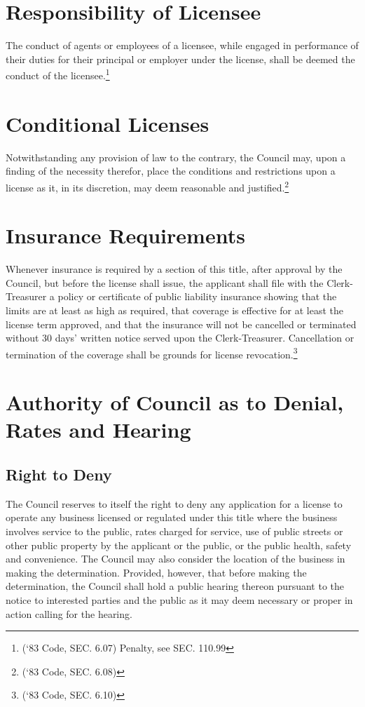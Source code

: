 \section{Responsibility of Licensee}
The conduct of agents or employees of a licensee, while engaged in performance of their duties for their principal or employer under the license, shall be deemed the conduct of the licensee.\footnote{(‘83 Code, SEC. 6.07)  Penalty, see SEC. 110.99}

\section{Conditional Licenses}
Notwithstanding any provision of law to the contrary, the Council may, upon a finding of the necessity therefor, place the conditions and restrictions upon a license as it, in its discretion, may deem reasonable and justified.\footnote{(‘83 Code, SEC. 6.08)}

\section{Insurance Requirements}
Whenever insurance is required by a section of this title, after approval by the Council, but before the license shall issue, the applicant shall file with the Clerk-Treasurer a policy or certificate of public liability insurance showing that the limits are at least as high as required, that coverage is effective for at least the license term approved, and that the insurance will not be cancelled or terminated without 30 days’ written notice served upon the Clerk-Treasurer.  Cancellation or termination of the coverage shall be grounds for license revocation.\footnote{(‘83 Code, SEC. 6.10)}

\section{Authority of Council as to Denial, Rates and Hearing}
\subsection{Right to Deny}
The Council reserves to itself the right to deny any application for a license to operate any business licensed or regulated under this title where the business involves service to the public, rates charged for service, use of public streets or other public property by the applicant or the public, or the public health, safety and convenience.  The Council may also consider the location of the business in making the determination.  Provided, however, that before making the determination, the Council shall hold a public hearing thereon pursuant to the notice to interested parties and the public as it may deem necessary or proper in action calling for the hearing.
